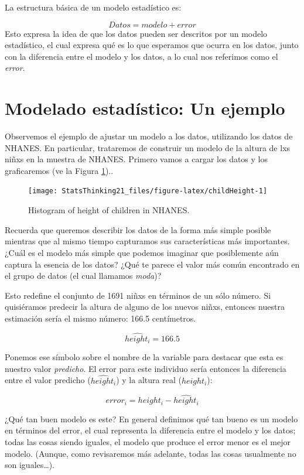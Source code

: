 \documentclass[
  12pt,
]{book}
\begin{document}
La estructura básica de un modelo estadístico es:

\[
Datos= modelo + error
\]
Esto expresa la idea de que los datos pueden ser descritos por un modelo estadístico, el cual expresa qué es lo que esperamos que ocurra en los datos, junto con la diferencia entre el modelo y los datos, a lo cual nos referimos como el \emph{error}.

\hypertarget{modelado-estaduxedstico-un-ejemplo}{%
\section{Modelado estadístico: Un ejemplo}\label{modelado-estaduxedstico-un-ejemplo}}

Observemos el ejemplo de ajustar un modelo a los datos, utilizando los datos de NHANES. En particular, trataremos de construir un modelo de la altura de lxs niñxs en la muestra de NHANES. Primero vamos a cargar los datos y los graficaremos (ve la Figura \ref{fig:childHeight})..

\begin{figure}
\texttt{[image: StatsThinking21\_files/figure-latex/childHeight-1]} \caption{Histogram of height of children in NHANES.}\label{fig:childHeight}
\end{figure}

Recuerda que queremos describir los datos de la forma más simple posible mientras que al mismo tiempo capturamos sus características más importantes. ¿Cuál es el modelo más simple que podemos imaginar que posiblemente aún captura la esencia de los datos? ¿Qué te parece el valor más común encontrado en el grupo de datos (el cual llamamos \emph{moda})?

Esto redefine el conjunto de 1691 niñxs en términos de un sólo número. Si quisiéramos predecir la altura de alguno de los nuevos niñxs, entonces nuestra estimación sería el mismo número: 166.5 centímetros.

\[
\hat{height_i} = 166.5
\]

Ponemos ese símbolo sobre el nombre de la variable para destacar que esta es nuestro valor \emph{predicho}. El error para este individuo sería entonces la diferencia entre el valor predicho (\(\hat{height_i}\)) y la altura real (\(height_i\)):

\[
error_i = height_i - \hat{height_i}
\]

¿Qué tan buen modelo es este? En general definimos qué tan bueno es un modelo en términos del error, el cual representa la diferencia entre el modelo y los datos; todas las cosas siendo iguales, el modelo que produce el error menor es el mejor modelo. (Aunque, como revisaremos más adelante, todas las cosas usualmente no son iguales\ldots).
\end{document}
